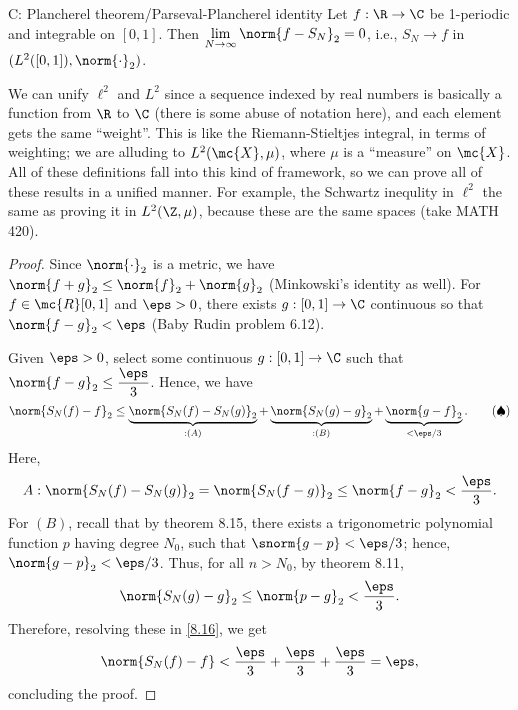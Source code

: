 \begin{ntheorem}{ C: Plancherel theorem/Parseval-Plancherel identity}
    Let \(f:\R\to\C\) be 1-periodic and integrable on \([0,1]\). Then \(\displaystyle\lim_{N\to\infty}\norm{f-S_N}_2=0\), i.e., \(S_N\to f\) in \((L^2([0,1]),\norm{\cdot}_2)\).
\end{ntheorem}
\begin{digression}
    We can unify \(\ell^2\) and \(L^2\) since a sequence indexed by real numbers is basically a function from \(\R\) to \(\C\) (there is some abuse of notation here), and each element gets the same ``weight''. This is like the Riemann-Stieltjes integral, in terms of weighting; we are alluding to \(L^2(\mc{X},\mu)\), where \(\mu\) is a ``measure'' on \(\mc{X}\). All of these definitions fall into this kind of framework, so we can prove all of these results in a unified manner. For example, the Schwartz inequlity in \(\ell^2\) the same as proving it in \(L^2(\Z,\mu)\), because these are the same spaces (take MATH 420).
\end{digression}
\begin{proof}
    Since \(\norm{\cdot}_2\) is a metric, we have \(\norm{f+g}_2\leq\norm{f}_2+\norm{g}_2\) (Minkowski's identity as well). For \(f\in\mc{R}[0,1]\) and \(\eps>0\), there exists \(g:[0,1]\to\C\) continuous so that \(\norm{f-g}_2<\eps\) (Baby Rudin problem 6.12).

    \medskip

    Given \(\eps>0\), select some continuous \(g:[0,1]\to\C\) such that \(\norm{f-g}_2\leq \displaystyle\frac{\eps}{3}\). Hence, we have 
    \begin{equation*} 
        \norm{S_N(f)-f}_2\leq\underbrace{\norm{S_N(f)-S_N(g)}_2}_{:(A)}+\underbrace{\norm{S_N(g)-g}_2}_{:(B)}+\underbrace{\norm{g-f}_2}_{<\eps/3}.\tag{\(\spadesuit\)}\label{8.16}
    \end{equation*}
    Here, 
    \begin{equation*} 
        A:\norm{S_N(f)-S_N(g)}_2=\norm{S_N(f-g)}_2\leq\norm{f-g}_2<\frac{\eps}{3}.
    \end{equation*}
    For \((B)\), recall that by theorem 8.15, there exists a trigonometric polynomial function \(p\) having degree \(N_0\), such that \(\snorm{g-p}<\eps/3\); hence, \(\norm{g-p}_2<\eps/3\). Thus, for all \(n>N_0\), by theorem 8.11,
    \begin{equation*} 
        \norm{S_N(g)-g}_2\leq\norm{p-g}_2<\frac{\eps}{3}.
    \end{equation*}
    Therefore, resolving these in \cref{8.16}, we get 
    \begin{equation*} 
        \norm{S_N(f)-f}<\frac{\eps}{3}+\frac{\eps}{3}+\frac{\eps}{3}=\eps,
    \end{equation*}
    concluding the proof.
\end{proof}
